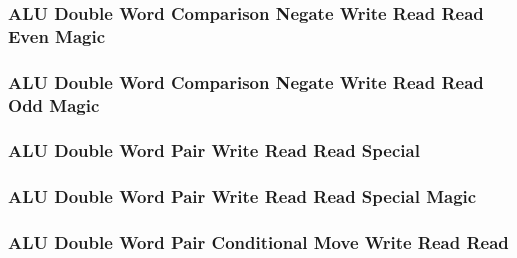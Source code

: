 

\subsubsection[{\small ALU Double Word Comparison Negate Write Read Read Even Magic}]{ALU Double Word Comparison Negate Write Read Read Even Magic} \label{sec:format-ALU-DCNWRRE.M}



\subsubsection[{\small ALU Double Word Comparison Negate Write Read Read Odd Magic}]{ALU Double Word Comparison Negate Write Read Read Odd Magic} \label{sec:format-ALU-DCNWRRO.M}



\subsubsection[{\small ALU Double Word Pair Write Read Read Special}]{ALU Double Word Pair Write Read Read Special} \label{sec:format-ALU-DPWRRS}



\subsubsection[{\small ALU Double Word Pair Write Read Read Special Magic}]{ALU Double Word Pair Write Read Read Special Magic} \label{sec:format-ALU-DPWRRS.M}



\subsubsection[{\small ALU Double Word Pair Conditional Move Write Read Read}]{ALU Double Word Pair Conditional Move Write Read Read} \label{sec:format-ALU-DPCMWRR}

